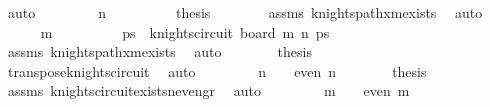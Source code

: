 \begin{isabellebody}
\ auto\isanewline
\ \ \isamarkupfalse%
\isanewline
\ \ \ \ \isamarkupfalse%
\ {\isachardoublequoteopen}n\ {\isacharequal}{\kern0pt}\ {}{\isachardoublequoteclose}\isanewline
\ \ \ \ \isamarkupfalse%
\ \isamarkupfalse%
\ {\isacharquery}{\kern0pt}thesis\isanewline
\ \ \ \ \ \ \isamarkupfalse%
\ assms\ knights{\isacharunderscore}{\kern0pt}path{\isacharunderscore}{\kern0pt}{}xm{\isacharunderscore}{\kern0pt}exists\ \isamarkupfalse%
\ auto\isanewline
\ \ \isamarkupfalse%
\isanewline
\ \ \ \ \isamarkupfalse%
\ {\isachardoublequoteopen}m\ {\isacharequal}{\kern0pt}\ {}{\isachardoublequoteclose}\isanewline
\ \ \ \ \isamarkupfalse%
\ \isamarkupfalse%
\ ps\ \ {\isachardoublequoteopen}knights{\isacharunderscore}{\kern0pt}circuit\ {\isacharparenleft}{\kern0pt}board\ m\ n{\isacharparenright}{\kern0pt}\ ps{\isachardoublequoteclose}\isanewline
\ \ \ \ \ \ \isamarkupfalse%
\ assms\ knights{\isacharunderscore}{\kern0pt}path{\isacharunderscore}{\kern0pt}{}xm{\isacharunderscore}{\kern0pt}exists\ \isamarkupfalse%
\ auto\isanewline
\ \ \ \ \isamarkupfalse%
\ \isamarkupfalse%
\ {\isacharquery}{\kern0pt}thesis\isanewline
\ \ \ \ \ \ \isamarkupfalse%
\ transpose{\isacharunderscore}{\kern0pt}knights{\isacharunderscore}{\kern0pt}circuit\ \isamarkupfalse%
\ auto\isanewline
\ \ \isamarkupfalse%
\isanewline
\ \ \ \ \isamarkupfalse%
\ {\isachardoublequoteopen}n\ {\isasymge}\ {}{}\ {\isasymand}\ even\ n{\isachardoublequoteclose}\isanewline
\ \ \ \ \isamarkupfalse%
\ \isamarkupfalse%
\ {\isacharquery}{\kern0pt}thesis\isanewline
\ \ \ \ \ \ \isamarkupfalse%
\ assms\ knights{\isacharunderscore}{\kern0pt}circuit{\isacharunderscore}{\kern0pt}exists{\isacharunderscore}{\kern0pt}n{\isacharunderscore}{\kern0pt}even{\isacharunderscore}{\kern0pt}gr{\isacharunderscore}{\kern0pt}{}{}\ \isamarkupfalse%
\ auto\isanewline
\ \ \isamarkupfalse%
\isanewline
\ \ \ \ \isamarkupfalse%
\ {\isachardoublequoteopen}m\ {\isasymge}\ {}{}\ {\isasymand}\ even\ m{\isachardoublequoteclose}\isanewline
\ \ \ \ \isamarkupfalse%
\ \isamarkupfalse%

\end{isabellebody}
